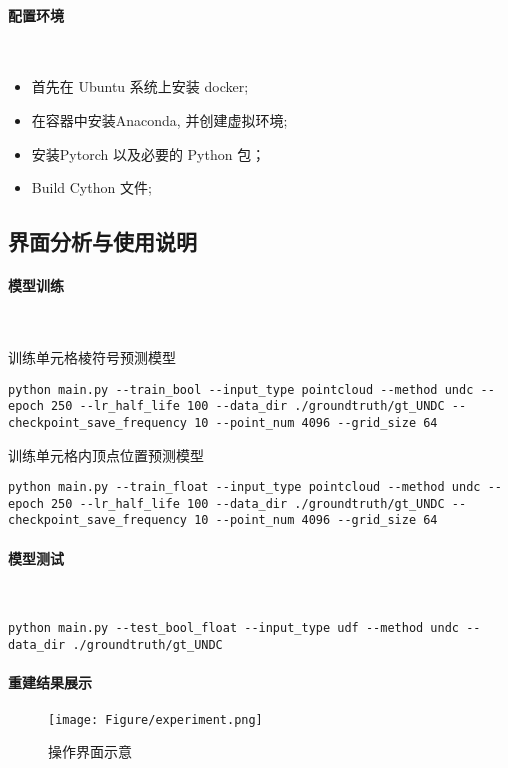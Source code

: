 \paragraph{配置环境}~{}

\begin{itemize}
	\item 首先在 Ubuntu 系统上安装 docker;
	\item 在容器中安装Anaconda, 并创建虚拟环境;
	\item 安装Pytorch 以及必要的 Python 包；
	\item Build Cython 文件;
\end{itemize}

\subsection{界面分析与使用说明}

\paragraph{模型训练}~{}

训练单元格棱符号预测模型
\lstset{language=bash}
\begin{lstlisting}
python main.py --train_bool --input_type pointcloud --method undc --epoch 250 --lr_half_life 100 --data_dir ./groundtruth/gt_UNDC --checkpoint_save_frequency 10 --point_num 4096 --grid_size 64 
\end{lstlisting}

训练单元格内顶点位置预测模型
\lstset{language=bash}
\begin{lstlisting}
python main.py --train_float --input_type pointcloud --method undc --epoch 250 --lr_half_life 100 --data_dir ./groundtruth/gt_UNDC --checkpoint_save_frequency 10 --point_num 4096 --grid_size 64
\end{lstlisting}
\paragraph{模型测试}~{}

\lstset{language=bash}
\begin{lstlisting}
python main.py --test_bool_float --input_type udf --method undc --data_dir ./groundtruth/gt_UNDC
\end{lstlisting}
\paragraph{重建结果展示}

\begin{figure}[H]
	\center
	\texttt{[image: Figure/experiment.png]}
	\centering
	\caption{操作界面示意}\label{fig:fig2}
\end{figure}


